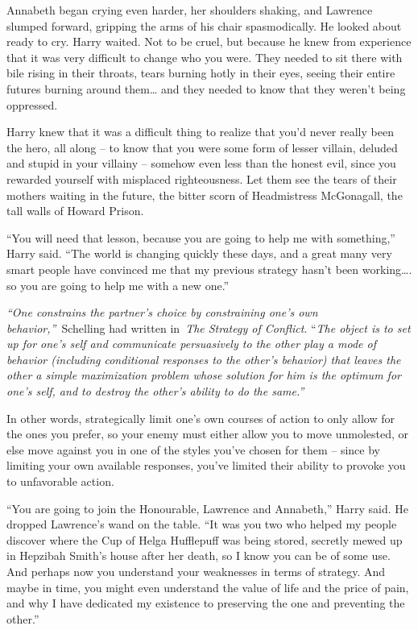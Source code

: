 Annabeth began crying even harder, her shoulders shaking, and Lawrence
slumped forward, gripping the arms of his chair spasmodically. He looked
about ready to cry. Harry waited. Not to be cruel, but because he knew
from experience that it was very difficult to change who you were. They
needed to sit there with bile rising in their throats, tears burning
hotly in their eyes, seeing their entire futures burning around
them\ldots{} and they needed to know that they weren't being oppressed.

Harry knew that it was a difficult thing to realize that you'd never
really been the hero, all along -- to know that you were some form of
lesser villain, deluded and stupid in your villainy -- somehow even less
than the honest evil, since you rewarded yourself with misplaced
righteousness. Let them see the tears of their mothers waiting in the
future, the bitter scorn of Headmistress McGonagall, the tall walls of
Howard Prison.

``You will need that lesson, because you are going to help me with
something,'' Harry said. ``The world is changing quickly these days, and
a great many very smart people have convinced me that my previous
strategy hasn't been working\ldots. so you are going to help me with a
new one.''

\emph{``One constrains the partner's choice by constraining one's own
behavior,''}~Schelling had written in~\emph{The Strategy of Conflict}.
``\emph{The object is to set up for one's self and communicate
persuasively to the other play a mode of behavior (including conditional
responses to the other's behavior) that leaves the other a simple
maximization problem whose solution for him is the optimum for one's
self, and to destroy the other's ability to do the same.''}

In other words, strategically limit one's own courses of action to only
allow for the ones you prefer, so your enemy must either allow you to
move unmolested, or else move against you in one of the styles you've
chosen for them -- since by limiting your own available responses,
you've limited their ability to provoke you to unfavorable action.

``You are going to join the Honourable, Lawrence and Annabeth,'' Harry
said. He dropped Lawrence's wand on the table. ``It was you two who
helped my people discover where the Cup of Helga Hufflepuff was being
stored, secretly mewed up in Hepzibah Smith's house after her death, so
I know you can be of some use. And perhaps now you understand your
weaknesses in terms of strategy. And maybe in time, you might even
understand the value of life and the price of pain, and why I have
dedicated my existence to preserving the one and preventing the other.''

